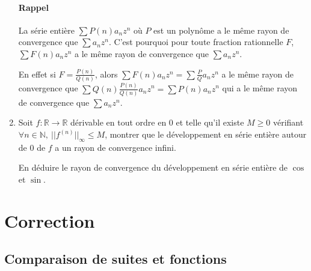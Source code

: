 \documentclass[]{article}
\begin{document}
\begin{enumerate}
\paragraph{Rappel} La série entière $\sum P(n)a_n z^n$ où $P$ est un polynôme a le même rayon de convergence que $\sum a_n z^n$. C'est pourquoi pour toute fraction rationnelle $F$, $\sum F(n) a_n z^n$ a le même rayon de convergence que $\sum a_n z^n$.

En effet si $F = \frac{P(n)}{Q(n)}$, alors $\sum F(n) a_n z^n = \sum \frac{P}{Q} a_n z^n$ a le même rayon de convergence que $\sum Q(n)\frac{P(n)}{Q(n)} a_n z^n = \sum P(n) a_n z^n$ qui a le même rayon de convergence que $\sum a_n z^n$.

\item Soit $f : \mathbb{R} \longrightarrow \mathbb{R}$ dérivable en tout ordre en $0$ et telle qu'il existe $M \geqslant 0$ vérifiant $\forall n \in \mathbb{N}, ~ ||f^{(n)}||_{\infty} \leqslant M$, montrer que le développement en série entière autour de $0$ de $f$ a un rayon de convergence infini.

En déduire le rayon de convergence du développement en série entière de $\cos$ et $\sin$.

\end{enumerate}

\section{Correction}

\subsection{Comparaison de suites et fonctions}
\end{document}
